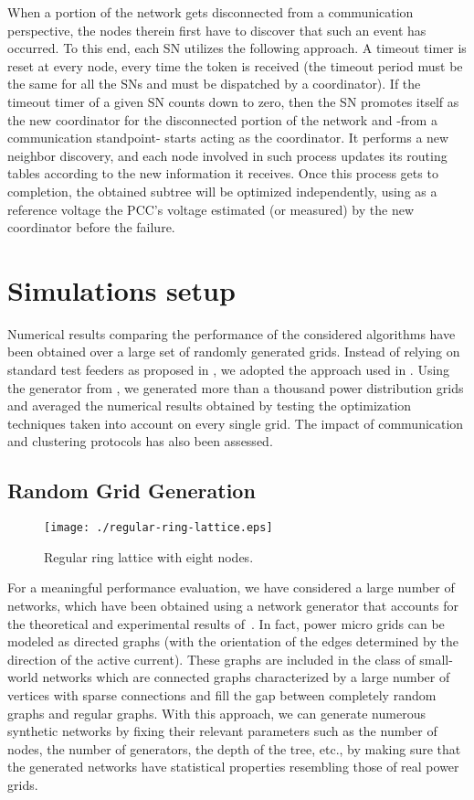\documentclass[journal]{IEEEtran}
\begin{document}
When a portion of the network gets disconnected from a communication perspective, the nodes therein first have to discover that such an event has occurred. To this end, each SN utilizes the following approach. A timeout timer is reset at every node, every time the token is received (the timeout period must be the same for all the SNs and must be dispatched by a coordinator). If the timeout timer of a given SN counts down to zero, then the SN promotes itself as the new coordinator for the disconnected portion of the network and -from a communication standpoint- starts acting as the coordinator. It performs a new neighbor discovery, and each node involved in such process updates its routing tables according to the new information it receives. Once this process gets to completion, the obtained subtree will be optimized independently, using as a reference voltage the PCC's voltage estimated (or measured) by the new coordinator before the failure.



\section{Simulations setup}
\label{sec:simsetup}
Numerical results comparing the performance of the considered algorithms have been obtained over a large set of randomly generated grids. Instead of relying on standard test feeders as proposed in \cite{TEST-FEEDER}, we adopted the approach used in \cite{TOM-PAG-AI}. Using the generator from \cite{PAG-AI}, we generated more than a thousand power distribution grids and averaged the numerical results obtained by testing the optimization techniques taken into account on every single grid. The impact of communication and clustering protocols has also been assessed.


\subsection{Random Grid Generation}

\label{ssec:gridgeneration}
\begin{figure}
\centering
\texttt{[image: ./regular-ring-lattice.eps]}
\caption{Regular ring lattice with eight nodes.\label{figure:ringLattice}}
\end{figure}

For a meaningful performance evaluation, we have considered a large number of networks, which have been obtained using a network generator that accounts for the theoretical and experimental results of~\cite{SmallWorld}. In fact, power micro grids can be modeled as directed graphs (with the orientation of the edges determined by the direction of the active current). These graphs are included in the class of small-world networks which are connected graphs characterized by a large number of vertices with sparse connections and fill the gap between completely random graphs and regular graphs. With this approach, we can generate numerous synthetic networks by fixing their relevant parameters such as the number of nodes, the number of generators, the depth of the tree, etc., by making sure that the generated networks have statistical properties resembling those of real power grids.
\end{document}
